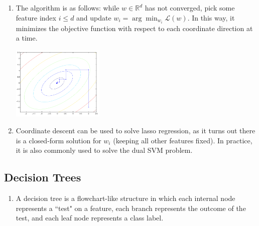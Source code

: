 \documentclass[10pt]{article}
\begin{document}
\begin{multicols}{2}
\begin{addmargin}[0.8em]{0.5em}
\begin{enumerate}[label=(\alph*)]
        \item The algorithm is as follows: while $w \in \mathbb{R}^d$ has not converged, pick some feature index $i \leq d$ and update $w_i = \arg\min_{w_i}\mathcal{L}(w)$. In this way, it minimizes the objective function with respect to each coordinate direction at a time.
        \begin{center}
            \includegraphics[width=4.4cm]{coorddescent.png}
        \end{center}
        
        \item Coordinate descent can be used to solve lasso regression, as it turns out there is a closed-form solution for $w_i$ (keeping all other features fixed). In practice, it is also commonly used to solve the dual SVM problem.
        
    \end{enumerate}    
    
    \subsection{Decision Trees}
    \begin{enumerate}[label=(\alph*)]
        \item A decision tree is a flowchart-like structure in which each internal node represents a     ``test" on a feature, each branch represents the outcome of the test, and each leaf node represents a class label.
        

\end{enumerate}
\end{addmargin}
\end{multicols}
\end{document}
